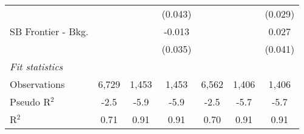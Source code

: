 \begin{tabular}{lcccccc}
                                &               &              & (0.043) &               &             & (0.029)\\   
   SB Frontier - Bkg.           &               &              & -0.013  &               &             & 0.027\\   
                                &               &              & (0.035) &               &             & (0.041)\\   
   \midrule
   \emph{Fit statistics}\\
   Observations                 & 6,729         & 1,453        & 1,453   & 6,562         & 1,406       & 1,406\\  
   Pseudo R$^2$                 & -2.5          & -5.9         & -5.9    & -2.5          & -5.7        & -5.7\\  
   R$^2$                        & 0.71          & 0.91         & 0.91    & 0.70          & 0.91        & 0.91\\  
   

\end{tabular}

